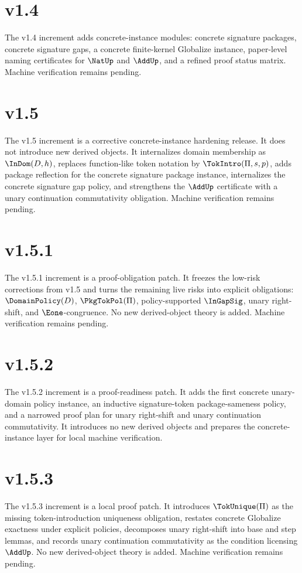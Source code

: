 \section*{v1.4}
The v1.4 increment adds concrete-instance modules: concrete signature packages, concrete signature gaps, a concrete finite-kernel Globalize instance, paper-level naming certificates for \(\NatUp\) and \(\AddUp\), and a refined proof status matrix. Machine verification remains pending.

\section*{v1.5}
The v1.5 increment is a corrective concrete-instance hardening release. It does not introduce new derived objects. It internalizes domain membership as \(\InDom(D,h)\), replaces function-like token notation by \(\TokIntro(\Pi,s,p)\), adds package reflection for the concrete signature package instance, internalizes the concrete signature gap policy, and strengthens the \(\AddUp\) certificate with a unary continuation commutativity obligation. Machine verification remains pending.


\section*{v1.5.1}
The v1.5.1 increment is a proof-obligation patch. It freezes the low-risk corrections from v1.5 and turns the remaining live risks into explicit obligations: \(\DomainPolicy(D)\), \(\PkgTokPol(\Pi)\), policy-supported \(\InGapSig\), unary right-shift, and \(\Eone\)-congruence. No new derived-object theory is added. Machine verification remains pending.


\section*{v1.5.2}
The v1.5.2 increment is a proof-readiness patch. It adds the first concrete unary-domain policy instance, an inductive signature-token package-sameness policy, and a narrowed proof plan for unary right-shift and unary continuation commutativity. It introduces no new derived objects and prepares the concrete-instance layer for local machine verification.

\section*{v1.5.3}
The v1.5.3 increment is a local proof patch. It introduces \(\TokUnique(\Pi)\) as the missing token-introduction uniqueness obligation, restates concrete Globalize exactness under explicit policies, decomposes unary right-shift into base and step lemmas, and records unary continuation commutativity as the condition licensing \(\AddUp\). No new derived-object theory is added. Machine verification remains pending.



